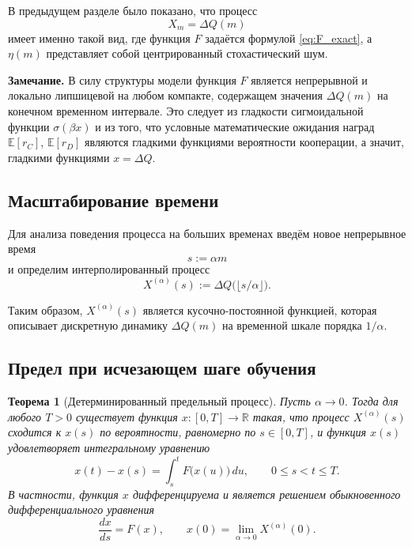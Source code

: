 \documentclass[12pt,a4paper]{article}
\newtheorem{theorem}{Теорема}
\theoremstyle{definition}
\begin{document}
В предыдущем разделе было показано, что процесс
\[
X_m=\Delta Q(m)
\]
имеет именно такой вид,
где функция $F$ задаётся формулой \eqref{eq:F_exact},
а $\eta(m)$ представляет собой центрированный стохастический шум.

\medskip

\textbf{Замечание.}
В силу структуры модели функция $F$ является непрерывной и локально
липшицевой на любом компакте, содержащем значения $\Delta Q(m)$
на конечном временном интервале.
Это следует из гладкости сигмоидальной функции $\sigma(\beta x)$
и из того, что условные математические ожидания наград
$\mathbb E[r_C]$, $\mathbb E[r_D]$
являются гладкими функциями вероятности кооперации,
а значит, гладкими функциями $x=\Delta Q$.

\subsection{Масштабирование времени}

Для анализа поведения процесса на больших временах
введём новое непрерывное время
\[
s:=\alpha m
\]
и определим интерполированный процесс
\[
X^{(\alpha)}(s)
:=
\Delta Q\bigl(\lfloor s/\alpha \rfloor\bigr).
\]

Таким образом, $X^{(\alpha)}(s)$ является кусочно-постоянной функцией,
которая описывает дискретную динамику $\Delta Q(m)$
на временной шкале порядка $1/\alpha$.

\subsection{Предел при исчезающем шаге обучения}

\begin{theorem}[Детерминированный предельный процесс]
\label{thm:ode_limit_simple}
Пусть $\alpha\to0$.
Тогда для любого $T>0$ существует функция $x:[0,T]\to\mathbb R$
такая, что процесс $X^{(\alpha)}(s)$
сходится к $x(s)$ по вероятности,
равномерно по $s\in[0,T]$,
и функция $x(s)$ удовлетворяет интегральному уравнению
\[
x(t)-x(s)
=
\int_s^t F\bigl(x(u)\bigr)\,du,
\qquad
0\le s<t\le T.
\]
В частности, функция $x$ дифференцируема и является решением
обыкновенного дифференциального уравнения
\[
\frac{dx}{ds}=F(x),
\qquad
x(0)=\lim_{\alpha\to0}X^{(\alpha)}(0).
\]
\end{theorem}
\end{document}
